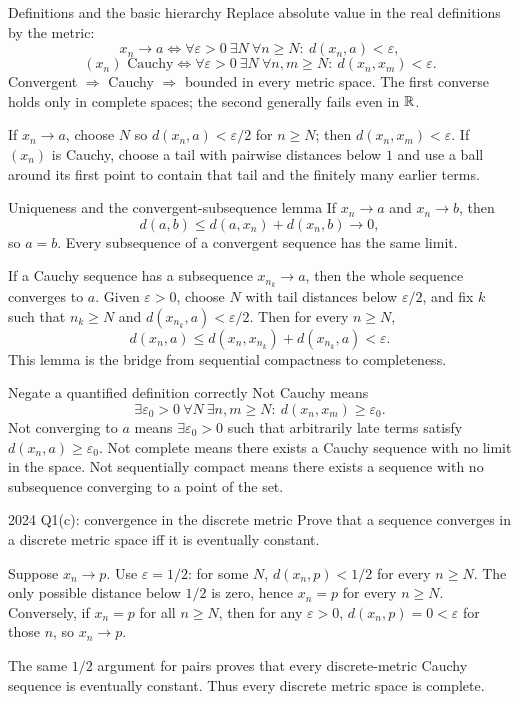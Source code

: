 \begin{note}{Definitions and the basic hierarchy}
Replace absolute value in the real definitions by the metric:
\[x_n\to a\iff\forall\varepsilon>0\ \exists N\ \forall n\ge N:\ d(x_n,a)<\varepsilon,\]
\[(x_n)\text{ Cauchy}\iff\forall\varepsilon>0\ \exists N\ \forall n,m\ge N:\ d(x_n,x_m)<\varepsilon.\]
Convergent $\Rightarrow$ Cauchy $\Rightarrow$ bounded in every metric space. The first converse holds only in complete spaces; the second generally fails even in $\mathbb R$.

If $x_n\to a$, choose $N$ so $d(x_n,a)<\varepsilon/2$ for $n\ge N$; then $d(x_n,x_m)<\varepsilon$. If $(x_n)$ is Cauchy, choose a tail with pairwise distances below $1$ and use a ball around its first point to contain that tail and the finitely many earlier terms.
\end{note}
\begin{note}{Uniqueness and the convergent-subsequence lemma}
If $x_n\to a$ and $x_n\to b$, then
\[d(a,b)\le d(a,x_n)+d(x_n,b)\to0,\]
so $a=b$. Every subsequence of a convergent sequence has the same limit.

If a Cauchy sequence has a subsequence $x_{n_k}\to a$, then the whole sequence converges to $a$. Given $\varepsilon>0$, choose $N$ with tail distances below $\varepsilon/2$, and fix $k$ such that $n_k\ge N$ and $d(x_{n_k},a)<\varepsilon/2$. Then for every $n\ge N$,
\[d(x_n,a)\le d(x_n,x_{n_k})+d(x_{n_k},a)<\varepsilon.\]
This lemma is the bridge from sequential compactness to completeness.
\end{note}
\begin{method}{Negate a quantified definition correctly}
Not Cauchy means
\[\exists\varepsilon_0>0\ \forall N\ \exists n,m\ge N:\ d(x_n,x_m)\ge\varepsilon_0.\]
Not converging to $a$ means $\exists\varepsilon_0>0$ such that arbitrarily late terms satisfy $d(x_n,a)\ge\varepsilon_0$. Not complete means there exists a Cauchy sequence with no limit in the space. Not sequentially compact means there exists a sequence with no subsequence converging to a point of the set.
\end{method}
\begin{exam}{2024 Q1(c): convergence in the discrete metric}
Prove that a sequence converges in a discrete metric space iff it is eventually constant.
\end{exam}
\begin{answer}
Suppose $x_n\to p$. Use $\varepsilon=1/2$: for some $N$, $d(x_n,p)<1/2$ for every $n\ge N$. The only possible distance below $1/2$ is zero, hence $x_n=p$ for every $n\ge N$. Conversely, if $x_n=p$ for all $n\ge N$, then for any $\varepsilon>0$, $d(x_n,p)=0<\varepsilon$ for those $n$, so $x_n\to p$.

The same $1/2$ argument for pairs proves that every discrete-metric Cauchy sequence is eventually constant. Thus every discrete metric space is complete.
\end{answer}
